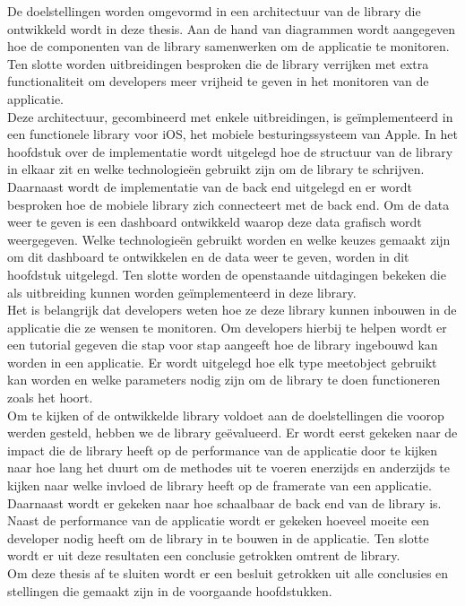 De doelstellingen worden omgevormd in een architectuur van de library die ontwikkeld wordt in deze thesis. Aan de hand van diagrammen wordt aangegeven hoe de componenten van de library samenwerken om de applicatie te monitoren. Ten slotte worden uitbreidingen besproken die de library verrijken met extra functionaliteit om developers meer vrijheid te geven in het monitoren van de applicatie. \\

Deze architectuur, gecombineerd met enkele uitbreidingen, is ge\"implementeerd in een functionele library voor iOS, het mobiele besturingssysteem van Apple. In het hoofdstuk over de implementatie wordt uitgelegd hoe de structuur van de library in elkaar zit en welke technologie\"en gebruikt zijn om de library te schrijven. Daarnaast wordt de implementatie van de back end uitgelegd en er wordt besproken hoe de mobiele library zich connecteert met de back end. Om de data weer te geven is een dashboard ontwikkeld waarop deze data grafisch wordt weergegeven. Welke technologie\"en gebruikt worden en welke keuzes gemaakt zijn om dit dashboard te ontwikkelen en de data weer te geven, worden in dit hoofdstuk uitgelegd. Ten slotte worden de openstaande uitdagingen bekeken die als uitbreiding kunnen worden ge\"implementeerd in deze library.\\


Het is belangrijk dat developers weten hoe ze deze library kunnen inbouwen in de applicatie die ze wensen te monitoren. Om developers hierbij te helpen wordt er een tutorial gegeven die stap voor stap aangeeft hoe de library ingebouwd kan worden in een applicatie. Er wordt uitgelegd hoe elk type meetobject gebruikt kan worden en welke parameters nodig zijn om de library te doen functioneren zoals het hoort. \\

Om te kijken of de ontwikkelde library voldoet aan de doelstellingen die voorop werden gesteld, hebben we de library ge\"evalueerd. Er wordt eerst gekeken naar de impact die de library heeft op de performance van de applicatie door te kijken naar hoe lang het duurt om de methodes uit te voeren enerzijds en anderzijds te kijken naar welke invloed de library heeft op de framerate van een applicatie. Daarnaast wordt er gekeken naar hoe schaalbaar de back end van de library is. Naast de performance van de applicatie wordt er gekeken hoeveel moeite een developer nodig heeft om de library in te bouwen in de applicatie. Ten slotte wordt er uit deze resultaten een conclusie getrokken omtrent de library. \\

Om deze thesis af te sluiten wordt er een besluit getrokken uit alle conclusies en stellingen die gemaakt zijn in de voorgaande hoofdstukken. \\


